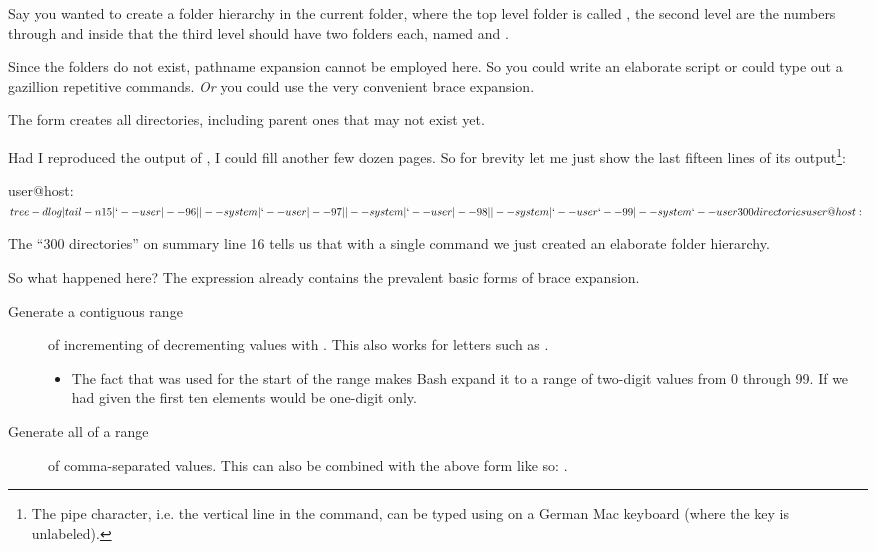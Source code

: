 \documentclass{olli-handout}
\begin{document}
Say you wanted to create a folder hierarchy in the current folder, where the top level folder is called , the second level are the numbers  through  and inside that the third level should have two folders each, named  and .

Since the folders do not exist, pathname expansion cannot be employed here. So you could write an elaborate script or could type out a gazillion repetitive commands. \emph{Or} you could use the very convenient brace expansion.


\begin{hintbox}
{\olliPenR} The  form creates all directories, including parent ones that may not exist yet.
\end{hintbox}

Had I reproduced the output of , I could fill another few dozen pages. So for brevity let me just show the last fifteen lines of its output\footnote{The pipe character, i.e. the vertical line \TTQ{\textbar} in the command, can be typed using  on a German Mac keyboard (where the key is unlabeled).}:

\begin{lstbash}
user@host:~$ tree -d log|tail -n 15
|   `-- user
|-- 96
|   |-- system
|   `-- user
|-- 97
|   |-- system
|   `-- user
|-- 98
|   |-- system
|   `-- user
`-- 99
|-- system
`-- user

300 directories
user@host:~$
\end{lstbash}

The ``300 directories'' on summary line 16 tells us that with a single command we just created an elaborate folder hierarchy.

So what happened here? The expression  already contains the prevalent basic forms of brace expansion.

\begin{description}
	\item[Generate a contiguous range] of incrementing of decrementing values with . This also works for letters such as .
	\begin{itemize}
		\item[\olliPenR] The fact that  was used for the start of the range makes Bash expand it to a range of two-digit values from 0 through 99. If we had given  the first ten elements would be one-digit only.
	\end{itemize}
	\item[Generate all of a range] of comma-separated values. This can also be combined with the above form like so: .
\end{description}
\end{document}
